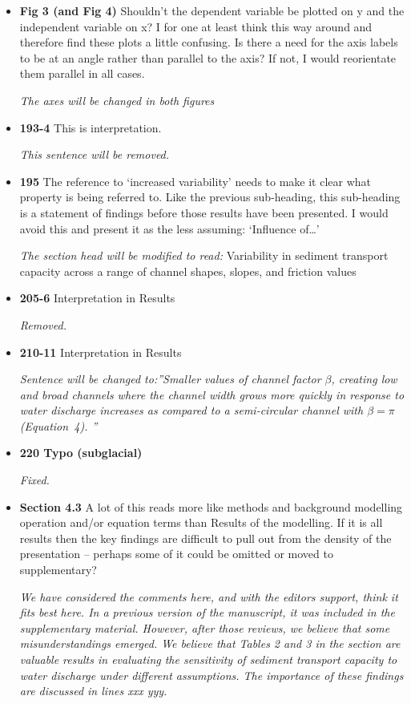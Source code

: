 \documentclass[11pt]{article}
\begin{document}
\begin{itemize}
  
\item \textbf{Fig 3 (and Fig 4)} Shouldn’t the dependent variable be plotted on y and the independent
  variable on x? I for one at least think this way around and therefore find
  these plots a little confusing.
  Is there a need for the axis labels to be at an angle rather than parallel to
  the axis? If not, I would reorientate them parallel in all cases.

  \textit{The axes will be changed in both figures}
  
\item \textbf{193-4} This is interpretation.

  \textit{This sentence will be removed.}
  
\item \textbf{195} The reference to ‘increased variability’ needs to make it clear what property
  is being referred to. Like the previous sub-heading, this sub-heading is a
  statement of findings before those results have been presented. I would
  avoid this and present it as the less assuming: ‘Influence of…’


  \textit{The section head will be modified to read:} Variability in sediment transport capacity across a range of channel shapes, slopes, and friction values

\item \textbf{205-6} Interpretation in Results

  \textit{Removed.}
  
\item \textbf{210-11} Interpretation in Results

  \textit{ Sentence will be changed to:''Smaller values of channel factor $\beta$, creating low and broad channels where the channel width grows more quickly in response to water discharge increases as compared to a semi-circular channel with $\beta = \pi$ (Equation~4).
''}
  
\item \textbf{220 Typo (subglacial)}


  \textit{Fixed.}
  
\item \textbf{Section 4.3} A lot of this reads more like methods and background modelling operation
  and/or equation terms than Results of the modelling. If it is all results then
  the key findings are difficult to pull out from the density of the presentation
  – perhaps some of it could be omitted or moved to supplementary?

  \textit{We have considered the comments here, and with the editors support, think it fits best here.
    In a previous version of the manuscript, it was included in the supplementary material. However, after those reviews, we believe that some misunderstandings emerged. We believe that Tables 2 and 3 in the section are valuable results in evaluating the sensitivity of sediment transport capacity to water discharge under different assumptions.
    The importance of these findings are discussed in lines xxx yyy.
  }


\end{itemize}
\end{document}
